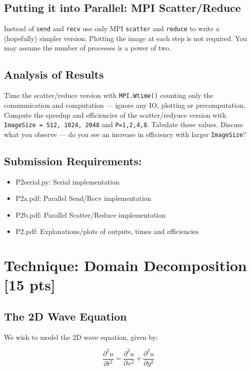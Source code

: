 \documentclass[12pt]{article}
\begin{document}
\subsection*{Putting it into Parallel: MPI Scatter/Reduce}
Instead of \texttt{send} and \texttt{recv} use only MPI \texttt{scatter} and \texttt{reduce} to write a (hopefully) simpler version.  Plotting the image at each step is not required.  You may assume the number of processes is a power of two.\\

\subsection*{Analysis of Results}
Time the scatter/reduce version with \texttt{MPI.Wtime()} counting only the communication and computation --- ignore any IO, plotting or precomputation.  Compute the speedup and efficiencies of the scatter/redyuce version with \texttt{ImageSize = 512, 1024, 2048} and \texttt{P=1,2,4,8}.  Tabulate these values.  Discuss what you observe --- do you see an increase in efficiency with larger \texttt{ImageSize}?

\subsection*{Submission Requirements:}
\begin{itemize}
\item P2serial.py: Serial implementation
\item P2a.pdf: Parallel Send/Recv implementation
\item P2b.pdf: Parallel Scatter/Reduce implementation
\item P2.pdf: Explanations/plots of outputs, times and efficiencies
\end{itemize}

\pagebreak

\section{Technique: Domain Decomposition [15 pts]}

\subsection*{The 2D Wave Equation}

We wish to model the 2D wave equation, given by:

$$
\frac{\partial^2 u}{\partial t^2} = \frac{\partial^2 u}{\partial x^2} + \frac{\partial^2 u}{\partial y^2}
$$
\end{document}
